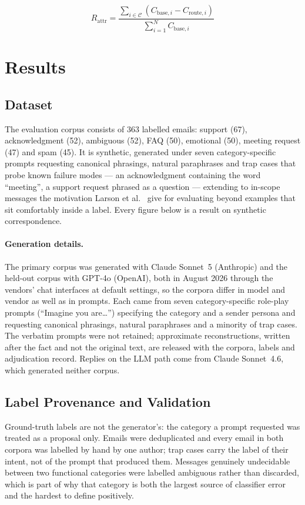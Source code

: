 \documentclass[conference]{IEEEtran}
\begin{document}
\begin{equation}
R_{\mathrm{attr}}
=
\frac{
\sum_{i \in \mathcal{C}}
\left(C_{\mathrm{base},i} - C_{\mathrm{route},i}\right)
}{
\sum_{i=1}^{N} C_{\mathrm{base},i}
}
\label{eq4}
\end{equation}

\section{Results}

\subsection{Dataset}
The evaluation corpus consists of 363 labelled emails: support (67), acknowledgment (52), ambiguous (52), FAQ (50), emotional (50), meeting request (47) and spam (45). It is synthetic, generated under seven category-specific prompts requesting canonical phrasings, natural paraphrases and trap cases that probe known failure modes --- an acknowledgment containing the word ``meeting'', a support request phrased as a question --- extending to in-scope messages the motivation Larson et al.~\cite{b20} give for evaluating beyond examples that sit comfortably inside a label. Every figure below is a result on synthetic correspondence.

\paragraph{Generation details.} The primary corpus was generated with Claude Sonnet~5 (Anthropic) and the held-out corpus with GPT-4o (OpenAI), both in August 2026 through the vendors' chat interfaces at default settings, so the corpora differ in model and vendor as well as in prompts. Each came from seven category-specific role-play prompts (``Imagine you are\ldots'') specifying the category and a sender persona and requesting canonical phrasings, natural paraphrases and a minority of trap cases. The verbatim prompts were not retained; approximate reconstructions, written after the fact and not the original text, are released with the corpora, labels and adjudication record. Replies on the LLM path come from Claude Sonnet~4.6, which generated neither corpus.

\subsection{Label Provenance and Validation}
Ground-truth labels are not the generator's: the category a prompt requested was treated as a proposal only. Emails were deduplicated and every email in both corpora was labelled by hand by one author; trap cases carry the label of their intent, not of the prompt that produced them. Messages genuinely undecidable between two functional categories were labelled ambiguous rather than discarded, which is part of why that category is both the largest source of classifier error and the hardest to define positively.
\end{document}
